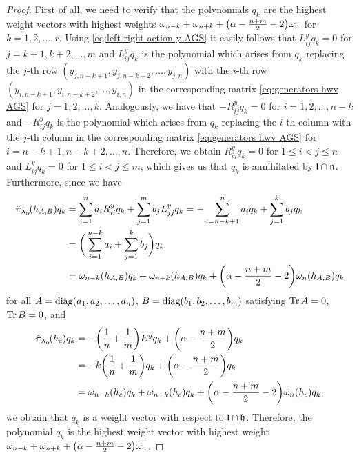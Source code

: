 \begin{proof}First of all, we need to verify that the polynomials $q_k$ are the highest weight vectors with highest weights $\omega_{n-k}+\omega_{n+k}+\big(\alpha - {n + m \over 2} -2\big)\omega_n$ for $k=1,2,\dots,r$. Using \eqref{eq:left right action y AGS} it easily follows that $L^y_{ij}q_k=0$ for $j=k+1,k+2,\dots,m$ and $L^y_{ij}q_k$ is the polynomial which arises from $q_k$ replacing the $j$-th row $(y_{j,n-k+1},y_{j,n-k+2},\dots,y_{j,n})$  with the $i$-th row $(y_{i,n-k+1},y_{i,n-k+2},\dots,y_{i,n})$ in the corresponding matrix \eqref{eq:generators hwv AGS} for $j=1,2,\dots,k$. Analogously, we have that $-R^y_{ij}q_k=0$ for $i=1,2,\dots,n-k$ and $-R^y_{ij}q_k$ is the polynomial which arises from $q_k$ replacing the $i$-th column  with the $j$-th column  in the corresponding matrix \eqref{eq:generators hwv AGS} for $i=n-k+1,n-k+2,\dots,n$. Therefore, we obtain $R^y_{ij}q_k=0$ for $1 \leq i < j \leq n$ and $L^y_{ij}q_k=0$ for $1 \leq i < j \leq m$, which gives us that $q_k$ is annihilated by $\mathfrak{l} \cap \mathfrak{n}$. Furthermore, since we have
\begin{align*}
  \hat{\pi}_{\lambda_\alpha}\!(h_{A,B})q_k &= \sum_{i=1}^n a_i R^y_{ii}q_k + \sum_{j=1}^m b_j L^y_{jj}q_k = -\sum_{i=n-k+1}^n a_i q_k + \sum_{j=1}^k b_j q_k \\
  &= \bigg(\sum_{i=1}^{n-k} a_i + \sum_{j=1}^k b_j \bigg)q_k \\
  &= \omega_{n-k}(h_{A,B})q_k + \omega_{n+k}(h_{A,B})q_k+ \bigg(\alpha-{n+m \over 2}-2\bigg)\omega_n(h_{A,B})q_k
\end{align*}
for all $A=\mathop {\rm diag} \nolimits(a_1,a_2,\dots,a_n)$, $B=\mathop {\rm diag} \nolimits(b_1,b_2,\dots,b_m)$ satisfying $\operatorname{\mathrm{Tr}} A=0$, $\operatorname{\mathrm{Tr}} B=0$, and
\begin{align*}
  \hat{\pi}_{\lambda_\alpha}\!(h_c)q_k&= -\bigg({1 \over n} + {1 \over m}\bigg)E^yq_k + \bigg(\alpha -{n+m \over 2}\bigg)q_k \\
  &= -k\bigg({1 \over n} + {1 \over m}\bigg)q_k+ \bigg(\alpha -{n+m \over 2}\bigg)q_k \\
  &= \omega_{n-k}(h_c)q_k + \omega_{n+k}(h_c)q_k+\bigg(\alpha-{n+m \over 2}-2\bigg)\omega_n(h_c)q_k,
\end{align*}
we obtain that $q_k$ is a weight vector with respect to $\mathfrak{l} \cap \mathfrak{h}$. Therefore, the polynomial $q_k$ is the highest weight vector with highest weight $\omega_{n-k}+ \omega_{n+k} + \big(\alpha-{n+m \over 2}-2\big)\omega_n$.


\end{proof}
